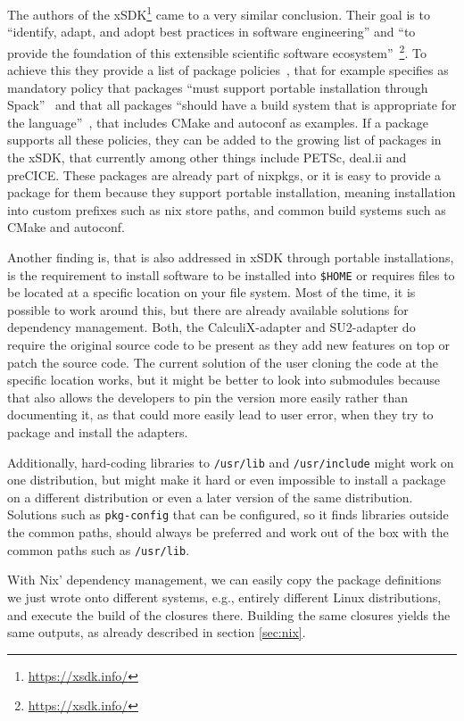 \documentclass{eceasst}
\begin{document}
The authors of the xSDK\footnote{\url{https://xsdk.info/}} came to a very similar conclusion.
Their goal is to ``identify, adapt, and adopt best practices in software engineering'' and ``to provide the foundation of this extensible scientific software ecosystem''~\footnote{\url{https://xsdk.info/}}.
To achieve this they provide a list of package policies~\cite{xSDK2023}, that for example specifies as mandatory policy that packages ``must support portable installation through Spack''~\cite{xSDK2023} and that all packages ``should have a build system that is appropriate for the language''~\cite{xSDK2023}, that includes CMake and autoconf as examples.
If a package supports all these policies, they can be added to the growing list of packages in the xSDK, that currently among other things include PETSc, deal.ii and preCICE.
These packages are already part of nixpkgs, or it is easy to provide a package for them because they support portable installation, meaning installation into custom prefixes such as nix store paths, and common build systems such as CMake and autoconf.

Another finding is, that is also addressed in xSDK through portable installations, is the requirement to install software to be installed into \texttt{\$HOME} or requires files to be located at a specific location on your file system.
Most of the time, it is possible to work around this, but there are already available solutions for dependency management.
Both, the CalculiX-adapter and SU2-adapter do require the original source code to be present as they add new features on top or patch the source code.
The current solution of the user cloning the code at the specific location works, but it might be better to look into submodules because that also allows the developers to pin the version more easily rather than documenting it, as that could more easily lead to user error, when they try to package and install the adapters.

Additionally, hard-coding libraries to \texttt{/usr/lib} and \texttt{/usr/include} might work on one distribution, but might make it hard or even impossible to install a package on a different distribution or even a later version of the same distribution.
Solutions such as \texttt{pkg-config} that can be configured, so it finds libraries outside the common paths, should always be preferred and work out of the box with the common paths such as \texttt{/usr/lib}.

With Nix' dependency management, we can easily copy the package definitions we just wrote onto different systems, e.g., entirely different Linux distributions, and execute the build of the closures there.
Building the same closures yields the same outputs, as already described in section \ref{sec:nix}.
\end{document}
